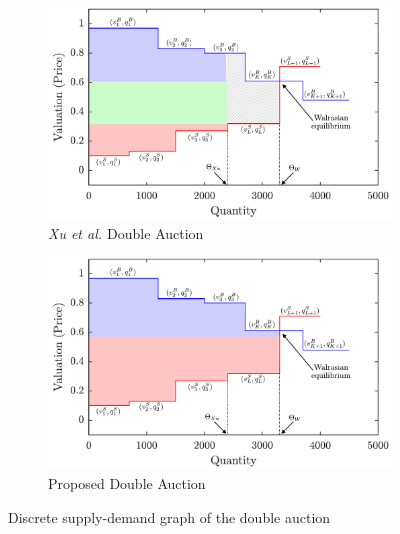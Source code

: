\begin{enumerate}
\begin{figure}[htbp]%
\centering
\begin{subfigure}{0.85\columnwidth}
\includegraphics[width=\columnwidth]{Figures/sd_XU.pdf}%
\caption{\textit{Xu et al. \cite{5462277}} Double Auction}%
\label{sd_xu}%
\end{subfigure}\hfill%
\begin{subfigure}{0.85\columnwidth}
\includegraphics[width=\columnwidth]{Figures/sd_proposed.pdf}%
\caption{Proposed Double Auction}%
\label{sd_proposed}%
\end{subfigure}\hfill%
\caption{Discrete supply-demand graph of the double auction}
\label{sd}%
\end{figure}


\end{enumerate}
